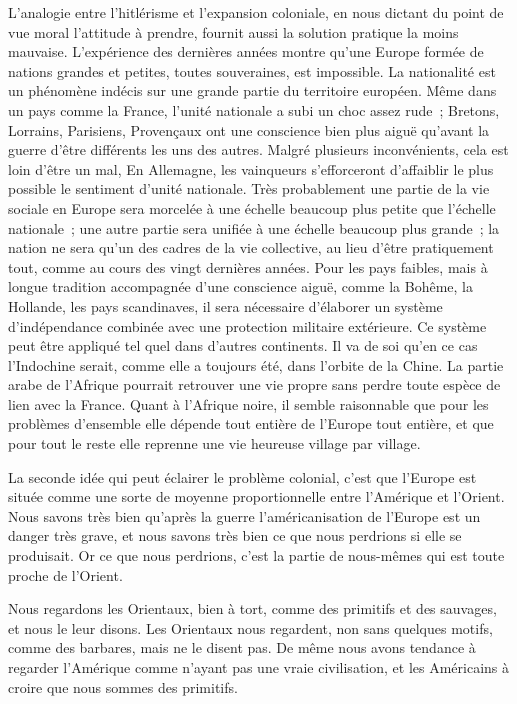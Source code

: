 \documentclass[french,twoside]{book} %
\begin{document}
L'analogie entre l'hitlérisme et l'expansion coloniale, en nous dictant du point de vue moral l'attitude à prendre, fournit aussi la solution pratique la moins mauvaise. L'expérience des dernières années montre qu'une Europe formée de nations grandes et petites, toutes souveraines, est impossible. La nationalité est un phénomène indécis sur une grande partie du territoire européen. Même dans un pays comme la France, l'unité nationale a subi un choc assez rude ; Bretons, Lorrains, Parisiens, Provençaux ont une conscience bien plus aiguë qu'avant la guerre d'être différents les uns des autres. Malgré plusieurs inconvénients, cela est loin d'être un mal, En Allemagne, les vainqueurs s'efforceront d'affaiblir le plus possible le sentiment d'unité nationale. Très probablement une partie de la vie sociale en Europe sera morcelée à une échelle beaucoup plus petite que l'échelle nationale ; une autre partie sera unifiée à une échelle beaucoup plus grande ; la nation ne sera qu'un des cadres de la vie collective, au lieu d'être pratiquement tout, comme au cours des vingt dernières années. Pour les pays faibles, mais à longue tradition accompagnée d'une conscience aiguë, comme la Bohême, la Hollande, les pays scandinaves, il sera nécessaire d'élaborer un système d'indépendance combinée avec une protection militaire extérieure. Ce système peut être appliqué tel quel dans d'autres continents. Il va de soi qu'en ce cas l'Indochine serait, comme elle a toujours été, dans l'orbite de la Chine. La partie arabe de l'Afrique pourrait retrouver une vie propre sans perdre toute espèce de lien avec la France. Quant à l'Afrique noire, il semble raisonnable que pour les problèmes d'ensemble elle dépende tout entière de l'Europe tout entière, et que pour tout le reste elle reprenne une vie heureuse village par village.\par
La seconde idée qui peut éclairer le problème colonial, c'est que l'Europe est située comme une sorte de moyenne proportionnelle entre l'Amérique et l'Orient. Nous savons très bien qu'après la guerre l'américanisation de l'Europe est un danger très grave, et nous savons très bien ce que nous perdrions si elle se produisait. Or ce que nous perdrions, c'est la partie de nous-mêmes qui est toute proche de l'Orient.\par
Nous regardons les Orientaux, bien à tort, comme des primitifs et des sauvages, et nous le leur disons. Les Orientaux nous regardent, non sans quelques motifs, comme des barbares, mais ne le disent pas. De même nous avons tendance à regarder l'Amérique comme n'ayant pas une vraie civilisa­tion, et les Américains à croire que nous sommes des primitifs.\par
\end{document}
